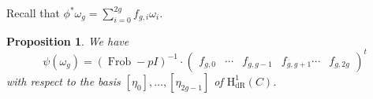 \documentclass[11pt, a4paper]{amsart}
\newcommand{\hdr}{\operatorname{H^1_{dR}}}
\newcommand{\Frob}{\operatorname{Frob}}
\newtheorem{proposition}[theorem]{Proposition}
\theoremstyle{remark}
\numberwithin{equation}{section}
\newcommand{\sg}{{}}
\newcommand{\sm}{{}}
\begin{document}
Recall that \sg{$\phi^*\omega_g=\sum_{i=0}^{2g}f_{g,i}\omega_i$}. 
\begin{proposition}\label{prop:psi(omega_g)}
\sm{
  We have
\begin{equation*}\label{Psi-Omega-From-Alpha}
\psi(\omega_g)=(\Frob-pI)^{-1}\cdot \begin{pmatrix}
f_{g,0} & \cdots & f_{g,g-1} & f_{g,g+1} \cdots & f_{g,2g}
  \end{pmatrix}^t
\end{equation*}}
with respect to the basis $[\eta_0],\ldots, [\eta_{2g-1}]$ of $\hdr(C)$.
\end{proposition}
\end{document}
